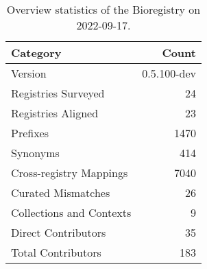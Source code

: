 \begin{table}
\centering
\caption{Overview statistics of the Bioregistry on 2022-09-17.}
\label{tab:bioregistry-summary}
\begin{tabular}{lr}
\toprule
                Category &       Count \\
\midrule
                 Version & 0.5.100-dev \\
     Registries Surveyed &          24 \\
      Registries Aligned &          23 \\
                Prefixes &        1470 \\
                Synonyms &         414 \\
 Cross-registry Mappings &        7040 \\
      Curated Mismatches &          26 \\
Collections and Contexts &           9 \\
     Direct Contributors &          35 \\
      Total Contributors &         183 \\
\bottomrule
\end{tabular}
\end{table}
